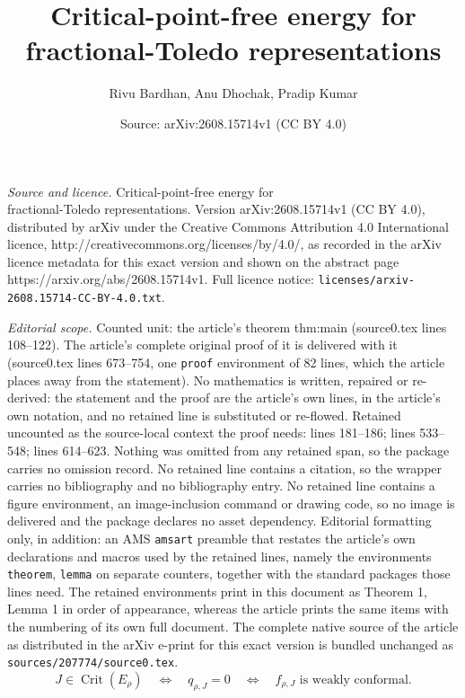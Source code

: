 \documentclass[10pt,a4paper]{amsart}
\title{Critical-point-free energy for\\ fractional-Toledo representations}
\author{Rivu Bardhan, Anu Dhochak, Pradip Kumar}
\date{Source: arXiv:2608.15714v1 (CC BY 4.0)}
\begin{document}
\maketitle

\noindent\emph{Source and licence.} Critical-point-free energy for\\ fractional-Toledo representations. Version arXiv:2608.15714v1 (CC BY 4.0), distributed by arXiv under the Creative Commons Attribution 4.0 International licence, http://creativecommons.org/licenses/by/4.0/, as recorded in the arXiv licence metadata for this exact version and shown on the abstract page https://arxiv.org/abs/2608.15714v1. Full licence notice: \texttt{licenses/arxiv-2608.15714-CC-BY-4.0.txt}.\par\smallskip

\noindent\textit{Editorial scope.} Counted unit: the article's theorem thm:main (source0.tex lines 108--122). The article's complete original proof of it is delivered with it (source0.tex lines 673--754, one \texttt{proof} environment of 82 lines, which the article places away from the statement). No mathematics is written, repaired or re-derived: the statement and the proof are the article's own lines, in the article's own notation, and no retained line is substituted or re-flowed.  Retained uncounted as the source-local context the proof needs: lines 181--186; lines 533--548; lines 614--623.  Nothing was omitted from any retained span, so the package carries no omission record.  No retained line contains a citation, so the wrapper carries no bibliography and no bibliography entry.  No retained line contains a figure environment, an image-inclusion command or drawing code, so no image is delivered and the package declares no asset dependency.  Editorial formatting only, in addition: an AMS \texttt{amsart} preamble that restates the article's own declarations and macros used by the retained lines, namely the environments \texttt{theorem}, \texttt{lemma} on separate counters, together with the standard packages those lines need.  The retained environments print in this document as Theorem 1, Lemma 1 in order of appearance, whereas the article prints the same items with the numbering of its own full document.  The complete native source of the article as distributed in the arXiv e-print for this exact version is bundled unchanged as \texttt{sources/207774/source0.tex}.
\begin{equation}\label{eq:critical-equivalence}
 J\in\operatorname{Crit}(E_\rho)
 \quad\Longleftrightarrow\quad q_{\rho,J}=0
 \quad\Longleftrightarrow\quad f_{\rho,J}
 \text{ is weakly conformal}.
\end{equation}
\end{document}
